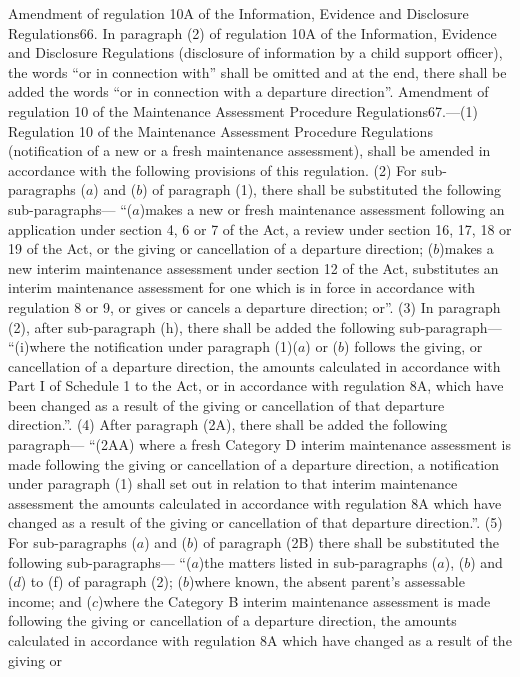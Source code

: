 \documentclass[a4paper]{article}
\begin{document}
Amendment of regulation 10A of the Information, Evidence and Disclosure
Regulations66. In paragraph (2) of regulation 10A of the Information, Evidence
and Disclosure Regulations (disclosure of information by a child support
officer), the words “or in connection with” shall be omitted and at the end,
there shall be added the words “or in connection with a departure direction”.
Amendment of regulation 10 of the Maintenance Assessment Procedure
Regulations67.—(1) Regulation 10 of the Maintenance Assessment Procedure
Regulations (notification of a new or a fresh maintenance assessment), shall be
amended in accordance with the following provisions of this regulation.
(2) For sub-paragraphs ($a$) and ($b$) of paragraph (1), there shall be substituted
the following sub-paragraphs—
“($a$)makes a new or fresh maintenance assessment following an application under
section 4, 6 or 7 of the Act, a review under section 16, 17, 18 or 19 of the
Act, or the giving or cancellation of a departure direction;
($b$)makes a new interim maintenance assessment under section 12 of the Act,
substitutes an interim maintenance assessment for one which is in force in
accordance with regulation 8 or 9, or gives or cancels a departure direction;
or”.
(3) In paragraph (2), after sub-paragraph (h), there shall be added the
following sub-paragraph—
“(i)where the notification under paragraph (1)($a$) or ($b$) follows the giving, or
cancellation of a departure direction, the amounts calculated in accordance with
Part I of Schedule 1 to the Act, or in accordance with regulation 8A, which have
been changed as a result of the giving or cancellation of that departure
direction.”.
(4) After paragraph (2A), there shall be added the following paragraph—
“(2AA) where a fresh Category D interim maintenance assessment is made following
the giving or cancellation of a departure direction, a notification under
paragraph (1) shall set out in relation to that interim maintenance assessment
the amounts calculated in accordance with regulation 8A which have changed as a
result of the giving or cancellation of that departure direction.”.
(5) For sub-paragraphs ($a$) and ($b$) of paragraph (2B) there shall be substituted
the following sub-paragraphs—
“($a$)the matters listed in sub-paragraphs ($a$), ($b$) and ($d$) to (f) of paragraph
(2);
($b$)where known, the absent parent’s assessable income; and
($c$)where the Category B interim maintenance assessment is made following the
giving or cancellation of a departure direction, the amounts calculated in
accordance with regulation 8A which have changed as a result of the giving or
\end{document}
